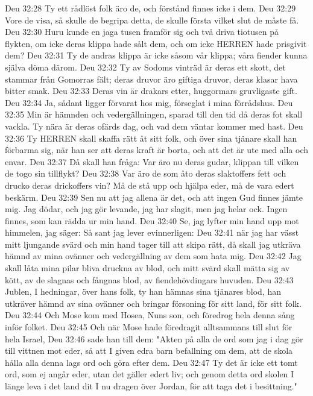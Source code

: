Deu 32:28  Ty ett rådlöst folk äro de, och förstånd finnes icke i dem.
Deu 32:29  Vore de visa, så skulle de begripa detta, de skulle första vilket slut de måste få.
Deu 32:30  Huru kunde en jaga tusen framför sig och två driva tiotusen på flykten, om icke deras klippa hade sålt dem, och om icke HERREN hade prisgivit dem?
Deu 32:31  Ty de andras klippa är icke såsom vår klippa; våra fiender kunna själva döma därom.
Deu 32:32  Ty av Sodoms vinträd är deras ett skott, det stammar från Gomorras fält; deras druvor äro giftiga druvor, deras klasar hava bitter smak.
Deu 32:33  Deras vin är drakars etter, huggormars gruvligaste gift.
Deu 32:34  Ja, sådant ligger förvarat hos mig, förseglat i mina förrådshus.
Deu 32:35  Min är hämnden och vedergällningen, sparad till den tid då deras fot skall vackla. Ty nära är deras ofärds dag, och vad dem väntar kommer med hast.
Deu 32:36  Ty HERREN skall skaffa rätt åt sitt folk, och över sina tjänare skall han förbarma sig, när han ser att deras kraft är borta, och att det är ute med alla och envar.
Deu 32:37  Då skall han fråga: Var äro nu deras gudar, klippan till vilken de togo sin tillflykt?
Deu 32:38  Var äro de som åto deras slaktoffers fett och drucko deras drickoffers vin? Må de stå upp och hjälpa eder, må de vara edert beskärm.
Deu 32:39  Sen nu att jag allena är det, och att ingen Gud finnes jämte mig. Jag dödar, och jag gör levande, jag har slagit, men jag helar ock. Ingen finnes, som kan rädda ur min hand.
Deu 32:40  Se, jag lyfter min hand upp mot himmelen, jag säger: Så sant jag lever evinnerligen:
Deu 32:41  när jag har vässt mitt ljungande svärd och min hand tager till att skipa rätt, då skall jag utkräva hämnd av mina ovänner och vedergällning av dem som hata mig.
Deu 32:42  Jag skall låta mina pilar bliva druckna av blod, och mitt svärd skall mätta sig av kött, av de slagnas och fångnas blod, av fiendehövdingars huvuden.
Deu 32:43  Jublen, I hedningar, över hans folk, ty han hämnas sina tjänares blod, han utkräver hämnd av sina ovänner och bringar försoning för sitt land, för sitt folk.
Deu 32:44  Och Mose kom med Hosea, Nuns son, och föredrog hela denna sång inför folket.
Deu 32:45  Och när Mose hade föredragit alltsammans till slut för hela Israel,
Deu 32:46  sade han till dem: "Akten på alla de ord som jag i dag gör till vittnen mot eder, så att I given edra barn befallning om dem, att de skola hålla alla denna lags ord och göra efter dem.
Deu 32:47  Ty det är icke ett tomt ord, som ej angår eder, utan det gäller edert liv; och genom detta ord skolen I länge leva i det land dit I nu dragen över Jordan, för att taga det i besittning."
